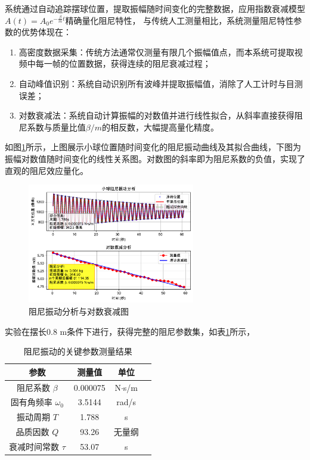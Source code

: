 系统通过自动追踪摆球位置，提取振幅随时间变化的完整数据，应用指数衰减模型 $A(t) = A_0e^{-\frac{\beta}{m} t}$精确量化阻尼特性，
与传统人工测量相比，系统测量阻尼特性参数的优势体现在：
\begin{enumerate}[leftmargin=*]
    \item 高密度数据采集：传统方法通常仅测量有限几个振幅值点，而本系统可提取视频中每一帧的位置数据，获得连续的阻尼衰减过程；
    
    \item 自动峰值识别：系统自动识别所有波峰并提取振幅值，消除了人工计时与目测误差；
    
    \item 对数衰减法：系统自动计算振幅的对数值并进行线性拟合，从斜率直接获得阻尼系数与质量比值$\beta/m$的相反数，大幅提高量化精度。
\end{enumerate}

如图\ref{fig:damping_analysis}所示，上图展示小球位置随时间变化的阻尼振动曲线及其拟合曲线，下图为振幅对数值随时间变化的线性关系图。对数图的斜率即为阻尼系数的负值，实现了直观的阻尼效应量化。


\begin{figure}[H]
    \centering
    \includegraphics[width=0.65\textwidth]{figures/22_trajectory_data_damping_analysis.pdf}
    \caption{阻尼振动分析与对数衰减图}
    \label{fig:damping_analysis}
\end{figure}



实验在摆长0.8 m条件下进行，获得完整的阻尼参数集，如表\ref{tab:damping_params}所示，

\begin{table}[H]
\centering
\caption{阻尼振动的关键参数测量结果}
\setlength{\tabcolsep}{7mm}
\begin{tabular}[c]{c c c c}
\toprule
{\textbf{参数}} & {\textbf{测量值}} & {\textbf{单位}} \\
\midrule
阻尼系数 $\beta$ & 0.000075 & N$\cdot$s/m \\
固有角频率 $\omega_0$ & 3.5144 & rad/s \\
振动周期 $T$ & 1.788 & s \\
品质因数 $Q$ & 93.26 & 无量纲 \\
衰减时间常数 $\tau$ & 53.07 & s \\
\bottomrule
\end{tabular}
\label{tab:damping_params}
\end{table}

